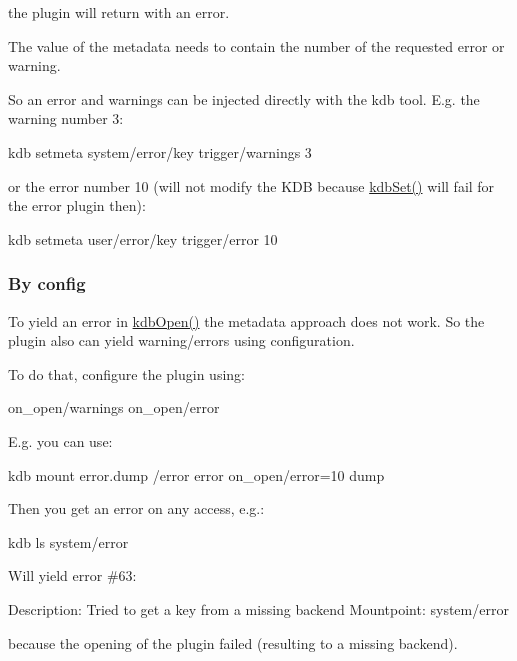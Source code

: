 the plugin will return with an error.

The value of the metadata needs to contain the number of the requested error or warning.

So an error and warnings can be injected directly with the kdb tool. E.\+g. the warning number 3\+: \begin{DoxyVerb}kdb setmeta system/error/key trigger/warnings 3
\end{DoxyVerb}


or the error number 10 (will not modify the K\+D\+B because {\ttfamily \hyperlink{group__kdb_ga11436b058408f83d303ca5e996832bcf}{kdb\+Set()}} will fail for the error plugin then)\+: \begin{DoxyVerb}kdb setmeta user/error/key trigger/error 10
\end{DoxyVerb}


\subsubsection*{By config}

To yield an error in \hyperlink{group__kdb_ga6808defe5870f328dd17910aacbdc6ca}{kdb\+Open()} the metadata approach does not work. So the plugin also can yield warning/errors using configuration.

To do that, configure the plugin using\+: \begin{DoxyVerb}on_open/warnings
on_open/error
\end{DoxyVerb}


E.\+g. you can use\+: \begin{DoxyVerb}kdb mount error.dump /error error on_open/error=10 dump
\end{DoxyVerb}


Then you get an error on any access, e.\+g.\+: \begin{DoxyVerb}kdb ls system/error
\end{DoxyVerb}


Will yield error \#63\+: \begin{DoxyVerb}Description: Tried to get a key from a missing backend
Mountpoint: system/error
\end{DoxyVerb}


because the opening of the plugin failed (resulting to a missing backend). 
